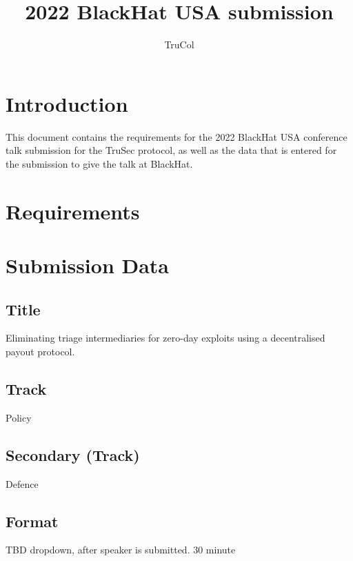 \documentclass{article}
\title{2022 BlackHat USA submission}
\author{TruCol}
\begin{document}
\maketitle
\section{Introduction}
This document contains the requirements for the 2022 BlackHat USA conference talk submission for the TruSec protocol, as well as the data that is entered for the submission to give the talk at BlackHat.
\section{Requirements}
\section{Submission Data}
\subsection*{Title}
Eliminating triage intermediaries for zero-day exploits using a decentralised payout protocol.
\subsection*{Track}
Policy
\subsection*{Secondary (Track)}
Defence
\subsection*{Format}
TBD dropdown, after speaker is submitted.
30 minute 
\end{document}
